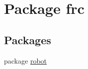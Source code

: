 \hypertarget{namespacefrc}{}\section{Package frc}
\label{namespacefrc}
\subsection*{Packages}
\begin{DoxyCompactItemize}
\item 
package \hyperlink{namespacefrc_1_1robot}{robot}
\end{DoxyCompactItemize}
